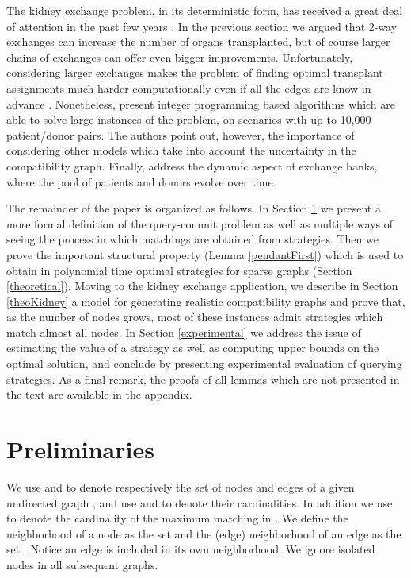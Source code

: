 \documentclass[12pt]{article}
\begin{document}
		The kidney exchange problem, in its deterministic form, has received a great deal of attention in the past few years \cite{david, roth3, roth1, roth2, segev}. In the previous section we argued that 2-way exchanges can increase the number of organs transplanted, but of course larger chains of exchanges can offer even bigger improvements. Unfortunately, considering larger exchanges makes the problem of finding optimal transplant assignments much harder computationally even if all the edges are know in advance \cite{david}. Nonetheless, \cite{david} present integer programming based algorithms which are able to solve large instances of the problem, on scenarios with up to 10,000 patient/donor pairs. The authors point out, however, the importance of considering other models which take into account the uncertainty in the compatibility graph. Finally, \cite{sandholm,unverDynamic,zenios} address the dynamic aspect of exchange banks, where the pool of patients and donors evolve over time. 
		
	The remainder of the paper is organized as follows. In Section \ref{prelim}	we present a more formal definition of the query-commit problem as well as multiple ways of seeing the process in which matchings are obtained from strategies. Then we prove the important structural property (Lemma \ref{pendantFirst}) which is used to obtain in polynomial time optimal strategies for sparse graphs (Section \ref{theoretical}). Moving to the kidney exchange application, we describe in Section \ref{theoKidney} a model for generating realistic compatibility graphs and prove that, as the number of nodes grows, most of these instances admit strategies which match almost all nodes. In Section \ref{experimental} we address the issue of estimating the value of a strategy as well as computing upper bounds on the optimal solution, and conclude by presenting experimental evaluation of querying strategies. As a final remark, the proofs of all lemmas which are not presented in the text are available in the appendix. 
	
	\section{Preliminaries} \label{prelim}

	We use  and  to denote respectively the set of nodes and edges of a given undirected graph , and use  and  to denote their cardinalities. In addition we use  to denote the cardinality of the maximum matching in . We define the neighborhood of a node  as the set  and the (edge) neighborhood of an edge  as the set . Notice an edge is included in its own neighborhood. We ignore isolated nodes in all subsequent graphs. 
	
\end{document}

